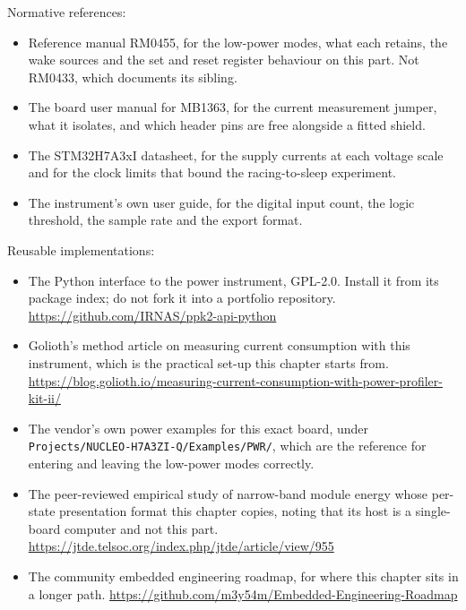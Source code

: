 Normative references:
\begin{itemize}
\item Reference manual RM0455, for the low-power modes, what each retains, the
wake sources and the set and reset register behaviour on this part. Not RM0433,
which documents its sibling.
\item The board user manual for MB1363, for the current measurement jumper, what
it isolates, and which header pins are free alongside a fitted shield.
\item The STM32H7A3xI datasheet, for the supply currents at each voltage scale
and for the clock limits that bound the racing-to-sleep experiment.
\item The instrument's own user guide, for the digital input count, the logic
threshold, the sample rate and the export format.
\end{itemize}

Reusable implementations:
\begin{itemize}
\item The Python interface to the power instrument, GPL-2.0. Install it from its
package index; do not fork it into a portfolio repository.\newline
\url{https://github.com/IRNAS/ppk2-api-python}
\item Golioth's method article on measuring current consumption with this
instrument, which is the practical set-up this chapter starts from.\newline
\url{https://blog.golioth.io/measuring-current-consumption-with-power-profiler-kit-ii/}
\item The vendor's own power examples for this exact board, under
\texttt{Projects/}\allowbreak\texttt{NUCLEO-H7A3ZI-Q/}\allowbreak\texttt{Examples/PWR/}, which are the reference for
entering and leaving the low-power modes correctly.
\item The peer-reviewed empirical study of narrow-band module energy whose
per-state presentation format this chapter copies, noting that its host is a
single-board computer and not this part.\newline
\url{https://jtde.telsoc.org/index.php/jtde/article/view/955}
\item The community embedded engineering roadmap, for where this chapter sits in
a longer path.\newline
\url{https://github.com/m3y54m/Embedded-Engineering-Roadmap}
\end{itemize}
